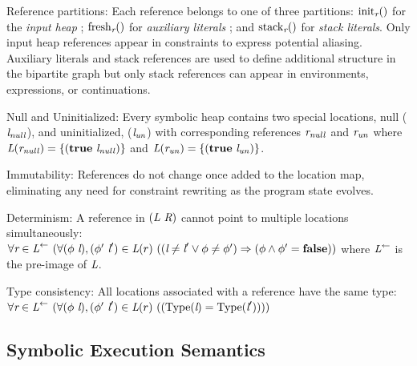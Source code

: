 \begin{compactdesc}
\item[Reference partitions:] Each reference belongs to one of three partitions: $\mathrm{init}_{\emph{r}}()$ for the \emph{input
  heap}%
  ; $\mathrm{fresh}_{\emph{r}}()$ for \emph{auxiliary
  literals}%
  ; and $\mathrm{stack}_{\emph{r}}()$ for \emph{stack
  literals}. %
  Only input heap references appear in constraints to express potential aliasing.
  Auxiliary literals and stack references are used to define additional structure in the bipartite graph but only stack references can appear in environments, expressions, or continuations.
\item[Null and Uninitialized:] Every symbolic heap contains 
two special locations, null ($\emph{l}_\mathit{null}$), and uninitialized,
  ($\emph{l}_\mathit{un}$)  with corresponding references 
  $\emph{r}_\mathit{null}$ and $\emph{r}_\mathit{un}$ 
  where $\emph{L}(\emph{r}_\mathit{null}) =
  \{(\textbf{true}\ \emph{l}_\mathit{null})\}$ and
  $\emph{L}(\emph{r}_\mathit{un}) =
  \{(\textbf{true}\ \emph{l}_\mathit{un})\}$. 
\item[Immutability:] References do not change once added to the
location map, eliminating any need for constraint rewriting as the program state evolves.
\item[Determinism:] A reference in $(\emph{L}\ \emph{R})$ cannot point to multiple locations simultaneously: 
$
\forall \cfgnt{r} \in \cfgnt{L}^\leftarrow\ (\forall (\phi\ \cfgnt{l}),(\phi^\prime\ \cfgnt{l}^\prime) \in \cfgnt{L}(r)\ (
(\cfgnt{l} \neq \cfgnt{l}^\prime \vee \phi \neq \phi^\prime) \Rightarrow (\phi \wedge \phi^\prime = \cfgt{false}))
$
where $\emph{L}^\leftarrow$ is the pre-image of $\emph{L}$. 
\item[Type consistency:] All locations associated with a reference have the same type:
$\forall \cfgnt{r} \in \cfgnt{L}^\leftarrow\ (\forall (\phi\ \cfgnt{l}),(\phi^\prime\ \cfgnt{l}^\prime) \in \cfgnt{L}(r)\ (
(\mathrm{Type}\lp\cfgnt{l}\rp = \mathrm{Type}\lp\cfgnt{l}^\prime\rp)))$

\end{compactdesc}


\subsection{Symbolic Execution Semantics}

